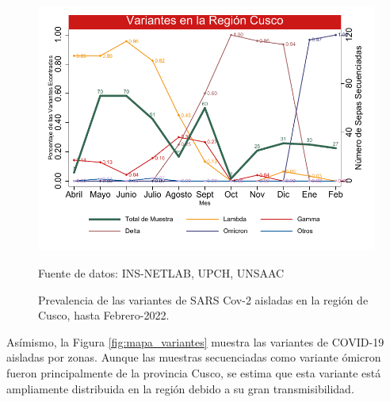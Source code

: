 \documentclass[12pt,a4paper,openany]{book}
\begin{document}
		\begin{figure}[h]
			\caption{Prevalencia de las variantes de SARS Cov-2 aisladas en la región de Cusco, hasta Febrero-2022. }\label{fig:variantes}
			\begin{center}
				\includegraphics[width=0.85\linewidth]{../figuras/variantes.pdf}
			\end{center}
			{\footnotesize {Fuente de datos: INS-NETLAB, UPCH, UNSAAC}}
		\end{figure}
		
	Asímismo, la Figura \ref{fig:mapa_variantes} muestra las variantes de COVID-19 aisladas por zonas. Aunque las muestras secuenciadas como variante ómicron fueron principalmente de la provincia Cusco, se estima que esta variante está ampliamente distribuida en la región debido a su gran transmisibilidad. 
	
\end{document}
